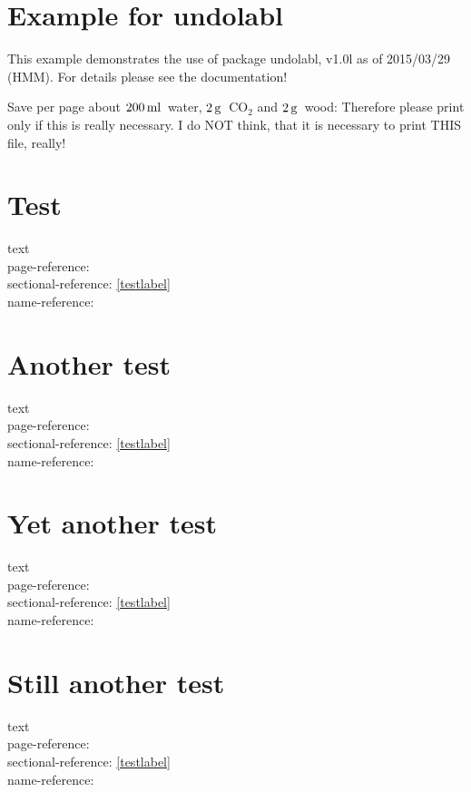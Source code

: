 \documentclass[british]{article}[2007/10/19]%
\gdef\unit#1{\mathord{\thinspace\mathrm{#1}}}%
\begin{document}
\section*{Example for undolabl}

This example demonstrates the use of package\newline
\textsf{undolabl}, v1.0l as of 2015/03/29 (HMM).\newline
For details please see the documentation!\newline

\noindent Save per page about $200\unit{ml}$~water,
$2\unit{g}$~CO$_{2}$ and $2\unit{g}$~wood:\newline
Therefore please print only if this is really necessary.\newline
I do NOT think, that it is necessary to print THIS file, really!

\bigskip

\section{Test}

text \label{testlabel}\\
page-reference: \pageref{testlabel}\\%
sectional-reference: \ref{testlabel}\\%
name-reference: %

\newpage

\section{Another test}

text \\
page-reference: \pageref{testlabel}\\%
sectional-reference: \ref{testlabel}\\%
name-reference: %

\newpage

\section{Yet another test}

text \\
page-reference: \pageref{testlabel}\\%
sectional-reference: \ref{testlabel}\\%
name-reference: %

\newpage

\section{Still another test}

text \\
page-reference: \pageref{testlabel}\\%
sectional-reference: \ref{testlabel}\\%
name-reference: %
\end{document}
